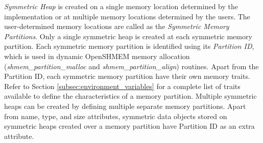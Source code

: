 \emph{Symmetric Heap} is created on a single memory location determined by the
implementation or at multiple memory locations determined by the users. The
user-determined memory locations are called as the \emph{Symmetric Memory
Partitions}. Only a single symmetric heap is created at each symmetric memory
partition. Each symmetric memory partition is identified using its
\emph{Partition ID}, which is used in dynamic OpenSHMEM memory allocation
(\textit{shmem\_partition\_malloc} and \textit{shmem\_partition\_align})
routines. Apart from the Partition ID, each symmetric memory partition have
their own memory traits. Refer to Section \ref{subsec:environment_variables}
for a complete list of traits available to define the characteristics of a
memory partition. Multiple symmetric heaps can be created by defining multiple
separate memory partitions. Apart from name, type, and size attributes,
symmetric data objects stored on symmetric heaps created over a memory
partition have Partition ID as an extra attribute.